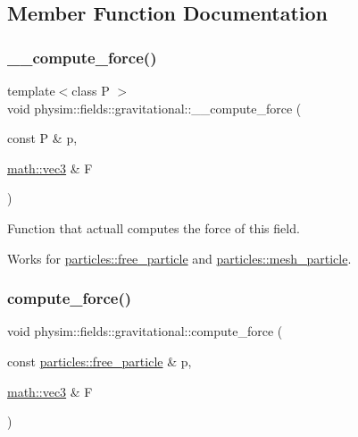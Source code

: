 \subsection{Member Function Documentation}
\mbox{\label{classphysim_1_1fields_1_1gravitational_acb6baab17fcb3b3cbf61b6690bd935fd}} 
\subsubsection{\texorpdfstring{\+\_\+\+\_\+compute\+\_\+force()}{\_\_compute\_force()}}
{\footnotesize\ttfamily template$<$class P $>$ \\
void physim\+::fields\+::gravitational\+::\+\_\+\+\_\+compute\+\_\+force (\begin{DoxyParamCaption}\item[{const P \&}]{p,  }\item[{\hyperlink{structphysim_1_1math_1_1vec3}{math\+::vec3} \&}]{F }\end{DoxyParamCaption})\hspace{0.3cm}{\ttfamily [private]}}



Function that actuall computes the force of this field. 

Works for \hyperlink{classphysim_1_1particles_1_1free__particle}{particles\+::free\+\_\+particle} and \hyperlink{classphysim_1_1particles_1_1mesh__particle}{particles\+::mesh\+\_\+particle}. \mbox{\label{classphysim_1_1fields_1_1gravitational_af852abc69f07c67eb888fac9e7637693}} 
\subsubsection{\texorpdfstring{compute\+\_\+force()}{compute\_force()}\hspace{0.1cm}{\footnotesize\ttfamily [1/3]}}
{\footnotesize\ttfamily void physim\+::fields\+::gravitational\+::compute\+\_\+force (\begin{DoxyParamCaption}\item[{const \hyperlink{classphysim_1_1particles_1_1free__particle}{particles\+::free\+\_\+particle} \&}]{p,  }\item[{\hyperlink{structphysim_1_1math_1_1vec3}{math\+::vec3} \&}]{F }\end{DoxyParamCaption})\hspace{0.3cm}{\ttfamily [virtual]}}



